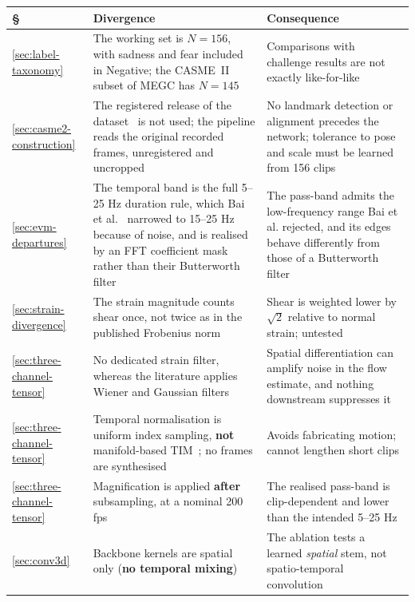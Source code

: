 \begin{table}[!htbp]
	\centering
	\footnotesize
	\begin{tabular}{@{}p{0.85cm} p{6.0cm} p{6.6cm}@{}}
		\hline
		\textbf{\S} & \textbf{Divergence} & \textbf{Consequence} \\
		\hline
		\ref{sec:label-taxonomy} & The working set is $N = 156$, with sadness and fear included in Negative; the CASME~II subset of MEGC has $N = 145$~\cite{see2019} & Comparisons with challenge results are not exactly like-for-like \\
		\ref{sec:casme2-construction} & The registered release of the dataset~\cite{yan2014} is not used; the pipeline reads the original recorded frames, unregistered and uncropped & No landmark detection or alignment precedes the network; tolerance to pose and scale must be learned from 156 clips \\
		\ref{sec:evm-departures} & The temporal band is the full 5--25 Hz duration rule, which Bai et al.~\cite{bai2021} narrowed to 15--25 Hz because of noise, and is realised by an FFT coefficient mask rather than their Butterworth filter & The pass-band admits the low-frequency range Bai et al. rejected, and its edges behave differently from those of a Butterworth filter \\
		\ref{sec:strain-divergence} & The strain magnitude counts shear once, not twice as in the published Frobenius norm~\cite{liong2014a,liong2016} & Shear is weighted lower by $\sqrt{2}$ relative to normal strain; untested \\
		\ref{sec:three-channel-tensor} & No dedicated strain filter, whereas the literature applies Wiener and Gaussian filters~\cite{liong2014a} & Spatial differentiation can amplify noise in the flow estimate, and nothing downstream suppresses it \\
		\ref{sec:three-channel-tensor} & Temporal normalisation is uniform index sampling, \textbf{not} manifold-based TIM~\cite{pfister2011,lu2015}; no frames are synthesised & Avoids fabricating motion; cannot lengthen short clips \\
		\ref{sec:three-channel-tensor} & Magnification is applied \textbf{after} subsampling, at a nominal 200 fps & The realised pass-band is clip-dependent and lower than the intended 5--25 Hz \\
		\ref{sec:conv3d} & Backbone kernels are spatial only (\textbf{no temporal mixing}) & The ablation tests a learned \textit{spatial} stem, not spatio-temporal convolution~\cite{ji2013,tran2015} \\

\end{tabular}
\end{table}
